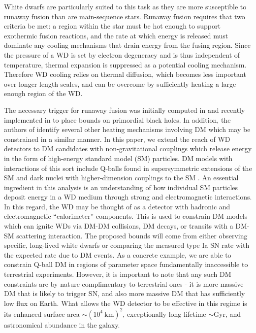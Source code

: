 \documentclass[twocolumn,showpacs,preprintnumbers,amsmath,amssymb,prd]{revtex4}
\begin{document}
White dwarfs are particularly suited to this task as they are more susceptible to runaway fusion than are main-sequence stars.
Runaway fusion requires that two criteria be met: a region within the star must be hot enough to support exothermic fusion reactions, and the rate at which energy is released must dominate any cooling mechanisms that drain energy from the fusing region.
Since the pressure of a WD is set by electron degeneracy and is thus independent of temperature, thermal expansion is suppressed as a potential cooling mechanism.
Therefore WD cooling relies on thermal diffusion, which becomes less important over longer length scales, and can be overcome by sufficiently heating a large enough region of the WD.

The necessary trigger for runaway fusion was initially computed in \cite{Woosley} and recently implemented in \cite{Graham:2015apa} to place bounds on primordial black holes. 
In addition, the authors of \cite{Graham:2015apa} identify several other heating mechanisms involving DM which may be constrained in a similar manner.
In this paper, we extend the reach of WD detectors to DM candidates with non-gravitational couplings which release energy in the form of high-energy standard model (SM) particles.
DM models with interactions of this sort include Q-balls found in supersymmetric extensions of the SM and dark nuclei with higher-dimension couplings to the SM \cite{Hardy:2014mqa}.
An essential ingredient in this analysis is an understanding of how individual SM particles deposit energy in a WD medium through strong and electromagnetic interactions. 
In this regard, the WD may be thought of as a detector with hadronic and electromagnetic ``calorimeter'' components.
This is used to constrain DM models which can ignite WDs via DM-DM collisions, DM decays, or transits with a DM-SM scattering interaction. 
The proposed bounds will come from either observing specific, long-lived white dwarfs or comparing the measured type Ia SN rate with the expected rate due to DM events.
As a concrete example, we are able to constrain Q-ball DM in regions of parameter space fundamentally inaccessible to terrestrial experiments.
However, it is important to note that any such DM constraints are by nature complimentary to terrestrial ones - it is more massive DM that is likely to trigger SN, and also more massive DM that has sufficiently low flux on Earth.
What allows the WD detector to be effective in this regime is its enhanced surface area $\sim (10^4 ~\text{km})^2$, exceptionally long lifetime $\sim \text{Gyr}$, and astronomical abundance in the galaxy. 
\end{document}
